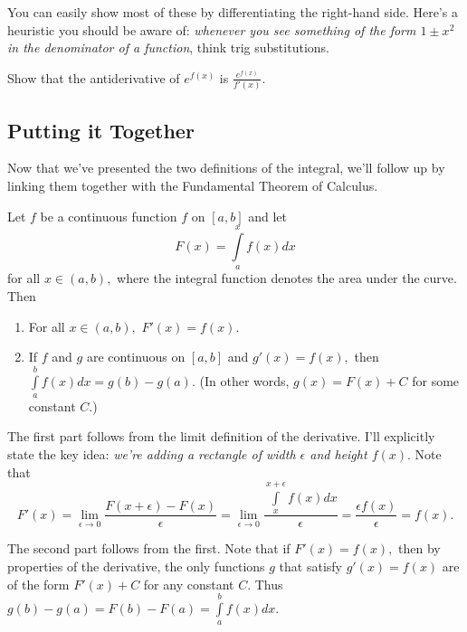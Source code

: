 \documentclass[mast]{lucky}
\begin{document}
You can easily show most of these by differentiating the right-hand side. Here's a heuristic you should be aware of: \emph{whenever you see something of the form $1\pm x^2$ in the denominator of a function}, think trig substitutions.

\begin{exer}[Antiderivative of $e^{f(x)}$]
Show that the antiderivative of $e^{f(x)}$ is $\frac{e^{f(x)}}{f'(x)}.$
\end{exer}

\subsection{Putting it Together}

Now that we've presented the two definitions of the integral, we'll follow up by linking them together with the Fundamental Theorem of Calculus.

\begin{theo}\label{theo:fun}
Let $f$ be a continuous function $f$ on $[a,b]$ and let
\[F(x)=\int\limits_{a}^x f(x)dx\]
for all $x\in (a,b),$ where the integral function denotes the area under the curve. Then
\begin{enumerate}
\item For all $x\in (a,b),$ $F'(x)=f(x).$

\item If $f$ and $g$ are continuous on $[a,b]$ and $g'(x)=f(x),$ then $\int\limits_{a}^{b}f(x)dx = g(b)-g(a).$ (In other words, $g(x)=F(x)+C$ for some constant $C.$)
\end{enumerate}
\end{theo}

\begin{pro}
The first part follows from the limit definition of the derivative. I'll explicitly state the key idea: \emph{we're adding a rectangle of width $\epsilon$ and height $f(x).$} Note that \[F'(x)=\lim_{\epsilon\to 0}\frac{F(x+\epsilon)-F(x)}{\epsilon}=\lim_{\epsilon\to 0}\frac{\int\limits_{x}^{x+\epsilon}f(x)dx}{\epsilon}=\frac{\epsilon f(x)}{\epsilon}=f(x).\]

The second part follows from the first. Note that if $F'(x)=f(x),$ then by properties of the derivative, the only functions $g$ that satisfy $g'(x)=f(x)$ are of the form $F'(x)+C$ for any constant $C.$ Thus $g(b)-g(a)=F(b)-F(a)=\int\limits_{a}^{b}f(x)dx.$

\begin{center}
\end{center}
\end{pro}
\end{document}
